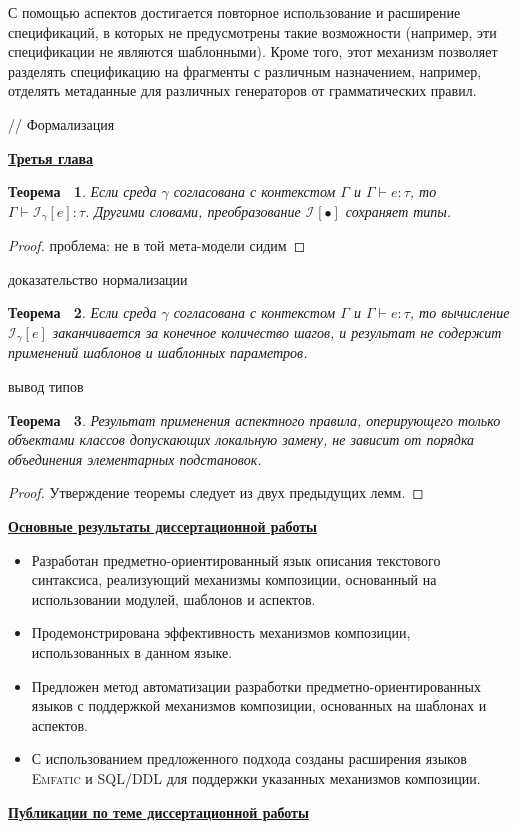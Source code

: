 \documentclass[12pt,a4paper]{article}
\newcommand{\tool}[1]{\textsc{#1}}
\theoremstyle{definition}
\theoremstyle{plain}
\newtheorem{Th}{Теорема~}[part]
\newcommand{\Inst}[2]{\mathcal{I}_{#1} \left[ #2 \right]}%
\newcommand{\afsubsection}[1]{\par \textbf{\underline{#1}}}
\begin{document}
С помощью аспектов достигается повторное использование  и расширение спецификаций, в которых не предусмотрены такие возможности (например, эти спецификации не являются шаблонными). Кроме того, этот механизм позволяет разделять спецификацию на фрагменты с различным назначением, например, отделять метаданные для различных генераторов от грамматических правил.

// Формализация

\afsubsection{Третья глава} 

\begin{Th}
Если среда $\gamma$ согласована с контекстом $\Gamma$ и $\Gamma \vdash e : \tau$, то $\Gamma \vdash \Inst{\gamma}{e} : \tau$. Другими словами, преобразование $\Inst{}{\bullet}$ сохраняет типы.
\end{Th}
\begin{proof}
проблема: не в той мета-модели сидим
\end{proof}

доказательство нормализации

\begin{Th}
Если среда $\gamma$ согласована с контекстом $\Gamma$ и $\Gamma \vdash e : \tau$, то вычисление $\Inst{\gamma}{e}$ заканчивается за конечное количество шагов, и результат не содержит применений шаблонов и шаблонных параметров.
\end{Th}

вывод типов

\begin{Th}
Результат применения аспектного правила, оперирующего только объектами классов допускающих локальную замену, не зависит от порядка объединения элементарных подстановок.
\end{Th}
\begin{proof}
Утверждение теоремы следует из двух предыдущих лемм.
\end{proof}


\afsubsection{Основные результаты диссертационной работы}
\begin{itemize}
\item Разработан предметно-ориентированный язык описания текстового синтаксиса, реализующий механизмы композиции, основанный на использовании модулей, шаблонов и аспектов.
\item Продемонстрирована эффективность механизмов композиции, использованных в данном языке.
\item Предложен метод автоматизации разработки предметно-ориентированных языков с поддержкой механизмов композиции, основанных на шаблонах и аспектов.
\item С использованием предложенного подхода созданы расширения языков \tool{Emfatic} и \tool{SQL/DDL} для поддержки указанных механизмов композиции.
\end{itemize}

\par
\begin{center}
\afsubsection{Публикации по теме диссертационной работы}
\end{center}
\end{document}
